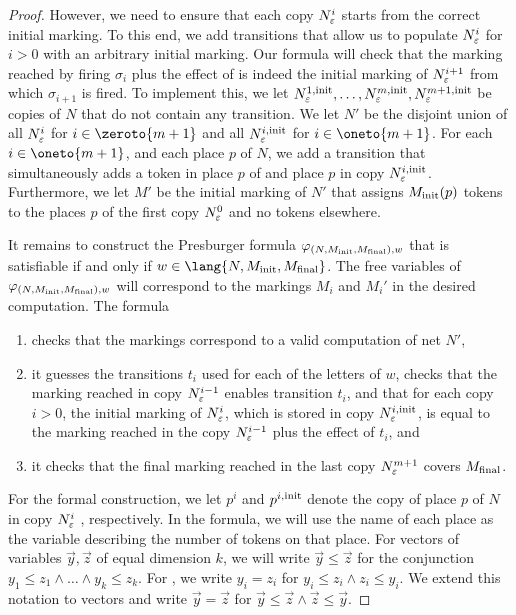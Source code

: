 \documentclass[../../diss.tex]{subfiles}
\begin{document}
\begin{proof}
    However, we need to ensure that each copy $N_\varepsilon^i$ starts from the correct initial marking.
    To this end, we add transitions that allow us to populate $N_\varepsilon^i$ for $i > 0$ with an arbitrary initial marking.
    Our formula will check that the marking reached by firing $\sigma_i$ plus the effect of  is indeed the initial marking of $N_\varepsilon^{i+1}$ from which $\sigma_{i+1}$ is fired.
    To implement this, we let $N_\varepsilon^{1,{\text{init}}}, \ldots, N_\varepsilon^{m,{\text{init}}}, N_\varepsilon^{m+1,{\text{init}}}$ be copies of $N$ that do not contain any transition.
    We let $N'$ be the disjoint union of all $N_\varepsilon^i$ for $i \in \zeroto{m+1}$ and all $N_\varepsilon^{i,{\text{init}}}$ for $i \in \oneto{m+1}$.
    For each $i \in \oneto{m+1}$, and each place $p$ of $N$, we add a transition that simultaneously adds a token in place $p$ of  and place $p$ in copy $N_\varepsilon^{i,{\text{init}}}$.
%
    Furthermore, we let $M'$ be the initial marking of $N'$ that assigns $M_{\text{init}}(p)$ tokens to the places $p$ of the first copy $N_\varepsilon^{0}$ and no tokens elsewhere.

    It remains to construct the Presburger formula $\varphi_{(N,M_{\text{init}},M_{\text{final}}),w}$ that is satisfiable if and only if $w \in \lang{N,\Minit,\Mfinal}$.
    The free variables of $\varphi_{(N,M_{\text{init}},M_{\text{final}}),w}$ will correspond to the markings $M_i$ and $M_i'$ in the desired computation.
    The formula
    \begin{enumerate}[(1)]
        \item checks that the markings correspond to a valid computation of net $N'$,
        \item
            it guesses the transitions $t_i$ used for each of the letters of $w$,
            checks that the marking reached in copy $N_\varepsilon^{i-1}$ enables transition $t_{i}$,
            and that for each copy $i > 0$, the initial marking of $N_\varepsilon^{i}$, which is stored in copy $N_\varepsilon^{i,{\text{init}}}$, is equal to the marking reached in the copy $N_\varepsilon^{i-1}$ plus the effect of $t_i$, and
        \item it checks that the final marking reached in the last copy $N_\varepsilon^{m+1}$ covers $M_{\text{final}}$.
    \end{enumerate}

    For the formal construction, we let $p^i$ and $p^{i,{\text{init}}}$ denote the copy of place $p$ of $N$ in copy $N_\varepsilon^i$ , respectively.
    In the formula, we will use the name of each place as the variable describing the  number of tokens on that place.
    For vectors of variables $\vec{y},\vec{z}$ of equal dimension $k$, we will write $\vec{y} \leq \vec{z}$ for the conjunction $y_1 \leq z_1 \wedge \ldots \wedge y_k \leq z_k$.
    For , we write $y_i = z_i$ for $y_i \leq z_i \wedge z_i \leq y_i$.
    We extend this notation to vectors and write $\vec{y} = \vec{z}$ for $\vec{y} \leq \vec{z} \wedge \vec{z} \leq \vec{y}$.


\end{proof}
\end{document}

